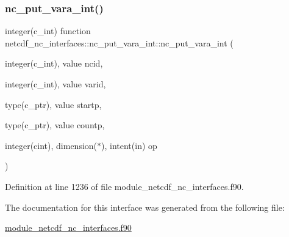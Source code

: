 \subsubsection{\texorpdfstring{nc\+\_\+put\+\_\+vara\+\_\+int()}{nc\_put\_vara\_int()}}
{\footnotesize\ttfamily integer(c\+\_\+int) function netcdf\+\_\+nc\+\_\+interfaces\+::nc\+\_\+put\+\_\+vara\+\_\+int\+::nc\+\_\+put\+\_\+vara\+\_\+int (\begin{DoxyParamCaption}\item[{integer(c\+\_\+int), value}]{ncid,  }\item[{integer(c\+\_\+int), value}]{varid,  }\item[{type(c\+\_\+ptr), value}]{startp,  }\item[{type(c\+\_\+ptr), value}]{countp,  }\item[{integer(cint), dimension($\ast$), intent(in)}]{op }\end{DoxyParamCaption})}



Definition at line 1236 of file module\+\_\+netcdf\+\_\+nc\+\_\+interfaces.\+f90.



The documentation for this interface was generated from the following file\+:\begin{DoxyCompactItemize}
\item 
\hyperlink{module__netcdf__nc__interfaces_8f90}{module\+\_\+netcdf\+\_\+nc\+\_\+interfaces.\+f90}\end{DoxyCompactItemize}
